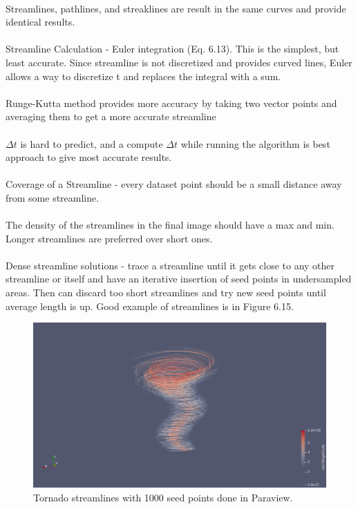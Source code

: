 \documentclass{article}
\begin{document}
\\
Streamlines, pathlines, and streaklines are result in the same curves and provide identical results.
\\\\
Streamline Calculation - Euler integration (Eq. 6.13). This is the simplest, but least accurate. Since streamline is not discretized and provides curved lines, Euler allows a way to discretize t and replaces the integral with a sum.
\\\\
Runge-Kutta method provides more accuracy by taking two vector points and averaging them to get a more accurate streamline
\\\\
$\Delta t$ is hard to predict, and a compute $\Delta t$ while running the algorithm is best approach to give most accurate results.
\\\\
Coverage of a Streamline - every dataset point should be a small distance away from some streamline. 
\\\\
The density of the streamlines in the final image should have a max and min. Longer streamlines are preferred over short ones.
\\\\
Dense streamline solutions - trace a streamline until it gets close to any other streamline or itself and have an iterative insertion of seed points in undersampled areas. Then can discard too short streamlines and try new seed points until average length is up. Good example of streamlines is in Figure 6.15.

\begin{figure}[H]
\caption{Tornado streamlines with 1000 seed points done in Paraview.}
\centering
\includegraphics[scale=.35]{tornado_streamlines_1000_points_pv.png}
\end{figure}
\end{document}
